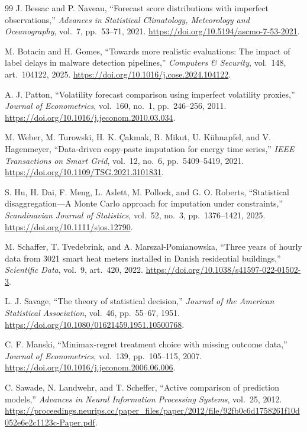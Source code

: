 \documentclass[12pt]{article}
\begin{document}
\begin{thebibliography}{99}
 J. Bessac and P. Naveau, ``Forecast score distributions
with imperfect observations,'' \emph{Advances in Statistical Climatology,
Meteorology and Oceanography}, vol.~7, pp.~53--71, 2021.
\url{https://doi.org/10.5194/ascmo-7-53-2021}.

 M. Botacin and H. Gomes, ``Towards more realistic
evaluations: The impact of label delays in malware detection pipelines,''
\emph{Computers \& Security}, vol.~148, art.~104122, 2025.
\url{https://doi.org/10.1016/j.cose.2024.104122}.

 A. J. Patton, ``Volatility forecast comparison using
imperfect volatility proxies,'' \emph{Journal of Econometrics}, vol.~160,
no.~1, pp.~246--256, 2011. \url{https://doi.org/10.1016/j.jeconom.2010.03.034}.

 M. Weber, M. Turowski, H. K. \c{C}akmak, R. Mikut,
U. K\"uhnapfel, and V. Hagenmeyer, ``Data-driven copy-paste imputation
for energy time series,'' \emph{IEEE Transactions on Smart Grid},
vol.~12, no.~6, pp.~5409--5419, 2021.
\url{https://doi.org/10.1109/TSG.2021.3101831}.

 S. Hu, H. Dai, F. Meng, L. Aslett, M. Pollock, and
G. O. Roberts, ``Statistical disaggregation---A Monte Carlo approach
for imputation under constraints,'' \emph{Scandinavian Journal of
Statistics}, vol.~52, no.~3, pp.~1376--1421, 2025.
\url{https://doi.org/10.1111/sjos.12790}.

 M. Schaffer, T. Tvedebrink, and A. Marszal-Pomianowska,
``Three years of hourly data from 3021 smart heat meters installed in
Danish residential buildings,'' \emph{Scientific Data}, vol.~9,
art.~420, 2022. \url{https://doi.org/10.1038/s41597-022-01502-3}.

 L. J. Savage, ``The theory of statistical decision,''
\emph{Journal of the American Statistical Association}, vol.~46,
pp.~55--67, 1951. \url{https://doi.org/10.1080/01621459.1951.10500768}.

 C. F. Manski, ``Minimax-regret treatment choice
with missing outcome data,'' \emph{Journal of Econometrics}, vol.~139,
pp.~105--115, 2007. \url{https://doi.org/10.1016/j.jeconom.2006.06.006}.

 C. Sawade, N. Landwehr, and T. Scheffer,
``Active comparison of prediction models,''
\emph{Advances in Neural Information Processing Systems}, vol.~25, 2012.
\url{https://proceedings.neurips.cc/paper_files/paper/2012/file/92fb0c6d1758261f10d052e6e2c1123c-Paper.pdf}.


\end{thebibliography}
\end{document}
